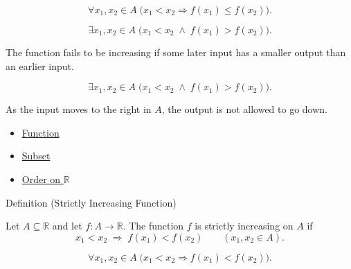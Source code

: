 \begin{remark*}
\[
  \forall x_1,x_2\in A\;\bigl(x_1<x_2\Rightarrow f(x_1)\leq f(x_2)\bigr).
\]
\end{remark*}

\begin{remark*}
\[
  \exists x_1,x_2\in A\;\bigl(x_1<x_2\;\wedge\;f(x_1)>f(x_2)\bigr).
\]
\end{remark*}

\begin{remark*}
The function fails to be increasing if some later input has a smaller
output than an earlier input.
\end{remark*}

\begin{remark*}
\[
  \exists x_1,x_2\in A\;\bigl(x_1<x_2\;\wedge\;f(x_1)>f(x_2)\bigr).
\]
\end{remark*}

\begin{remark*}[Interpretation]
As the input moves to the right in $A$, the output is not allowed to go
down.
\end{remark*}

\begin{dependencies}
\begin{itemize}
  \item \hyperref[def:function]{Function}
  \item \hyperref[def:subset]{Subset}
  \item \hyperref[def:order-on-r]{Order on $\mathbb{R}$}
\end{itemize}
\end{dependencies}

\begin{definitionbox}{Definition (Strictly Increasing Function)}
\begin{definition}
\label{def:function-strictly-increasing}
Let $A\subseteq\mathbb{R}$ and let $f:A\to\mathbb{R}$.  The function
$f$ is strictly increasing on $A$ if
\[
  x_1<x_2\;\Longrightarrow\;f(x_1)<f(x_2)
  \qquad (x_1,x_2\in A).
\]
\end{definition}
\end{definitionbox}

\begin{remark*}
\[
  \forall x_1,x_2\in A\;\bigl(x_1<x_2\Rightarrow f(x_1)<f(x_2)\bigr).
\]
\end{remark*}

